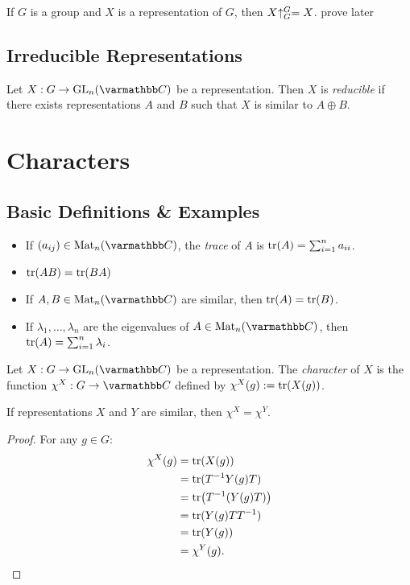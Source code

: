 \begin{example}
	If $G$ is a group and $X$ is a representation of $G$, then $X\hspace{-2.5pt}\uparrow_G^G = X$. {\color{red} prove later}
\end{example}

\subsection{Irreducible Representations}

\begin{definition}
	Let $X:G \rightarrow \GL_n(\bfC)$ be a representation. Then $X$ is \emph{reducible} if there exists representations $A$ and $B$ such that $X$ is similar to $A \oplus B$.
\end{definition}


\section{Characters}

\subsection{Basic Definitions \& Examples}

\begin{recall}
	\mbox{}
	\begin{itemize}[itemsep=1pt,topsep=3pt]
		\item If $(a_{ij}) \in \Mat_{n}(\bfC)$, the \emph{trace} of $A$ is $\operatorname{tr}(A)=\sum_{i=1}^{n}a_{ii} $.
		\item $\operatorname{tr}(AB) = \operatorname{tr}(BA)$
		\item If $A,B \in \Mat_n(\bfC)$ are similar, then $\operatorname{tr}(A) = \operatorname{tr}(B)$.
		\item If $\lambda_1,\ldots ,\lambda_n$ are the eigenvalues of $A \in \Mat_n(\bfC)$, then $\operatorname{tr}(A) = \sum_{i=1}^{n} \lambda_i$. 

	\end{itemize}
\end{recall}

\begin{definition}
	Let $X:G \rightarrow \GL_n(\bfC)$ be a representation. The \emph{character} of $X$ is the function $\chi^X:G \rightarrow \bfC$ defined by $\chi^X(g) := \operatorname{tr}(X(g))$.
\end{definition}

\begin{theorem}
	If representations $X$ and $Y$ are similar, then $\chi^X = \chi^Y$.
\end{theorem}
	\begin{proof}
		For any $g \in G$:
		\begin{align*}
			\chi^X(g)
			&= \operatorname{tr}(X(g)) \\
			&= \operatorname{tr}(T^{-1}Y(g)T) \\
			&= \operatorname{tr}\bigl( T^{-1}(Y(g)T) \bigr) \\
			&= \operatorname{tr}(Y(g)TT^{-1}) \\
			&= \operatorname{tr}(Y(g)) \\
			&= \chi^Y(g). \qedhere
		\end{align*}
	\end{proof}

